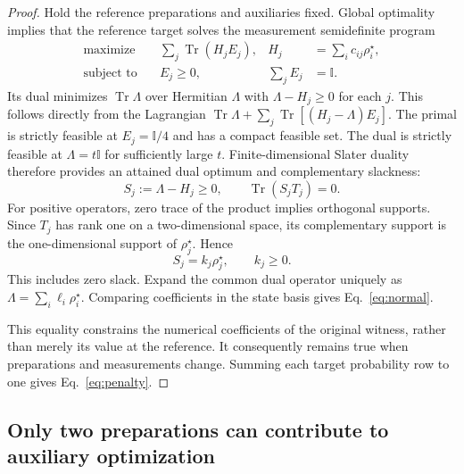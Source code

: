 \documentclass[11pt,a4paper]{article}
\newcommand{\id}{\mathbb{I}}
\newcommand{\tr}{\operatorname{Tr}}
\begin{document}
\begin{proof}
Hold the reference preparations and auxiliaries fixed. Global optimality
implies that the reference target solves the measurement semidefinite program
\begin{equation}
 \begin{aligned}
 \text{maximize}\quad &\sum_j\tr(H_jE_j),
 & H_j&=\sum_i c_{ij}\rho_i^\star,\\
 \text{subject to}\quad &E_j\geq0,
 & \sum_jE_j&=\id.
 \end{aligned}
 \label{eq:primal}
\end{equation}
Its dual minimizes $\tr\Lambda$ over Hermitian $\Lambda$ with
$\Lambda-H_j\geq0$ for each $j$. This follows directly from the Lagrangian
$\tr\Lambda+\sum_j\tr[(H_j-\Lambda)E_j]$.
The primal is strictly feasible at $E_j=\id/4$ and has a compact feasible
set. The dual is strictly feasible at $\Lambda=t\id$ for sufficiently
large $t$. Finite-dimensional Slater duality~\cite{Boyd2004} therefore
provides an attained dual optimum and complementary slackness:
\begin{equation}
 S_j:=\Lambda-H_j\geq0,\qquad \tr(S_jT_j)=0.
 \label{eq:slack}
\end{equation}
For positive operators, zero trace of the product implies orthogonal supports.
Since $T_j$ has rank one on a two-dimensional space, its complementary
support is the one-dimensional support of $\rho_j^\star$. Hence
\begin{equation}
 S_j=k_j\rho_j^\star,\qquad k_j\geq0.
 \label{eq:rankone}
\end{equation}
This includes zero slack. Expand the common dual operator uniquely as
$\Lambda=\sum_i\ell_i\rho_i^\star$. Comparing coefficients in the state
basis gives Eq.~\eqref{eq:normal}.

This equality constrains the numerical coefficients of the original witness,
rather than merely its value at the reference. It consequently remains true
when preparations and measurements change. Summing each target probability
row to one gives Eq.~\eqref{eq:penalty}.
\end{proof}

\subsection{Only two preparations can contribute to auxiliary optimization}
\end{document}
